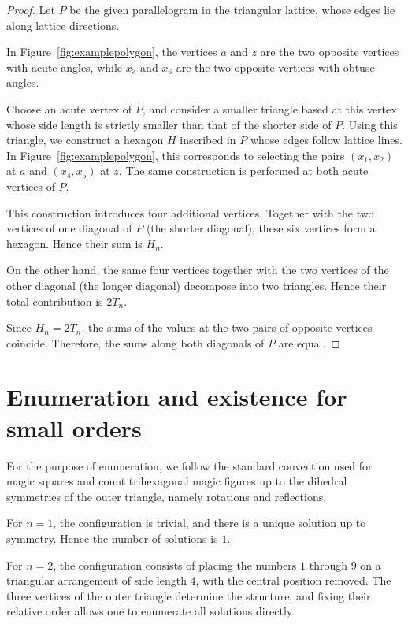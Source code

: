 \documentclass[11pt]{article}
\theoremstyle{plain}
\theoremstyle{definition}
\begin{document}
\begin{proof}
Let $P$ be the given parallelogram in the triangular lattice,
whose edges lie along lattice directions.

In Figure~\ref{fig:examplepolygon}, the vertices $a$ and $z$ are the two opposite vertices with acute angles, 
while $x_3$ and $x_6$ are the two opposite vertices with obtuse angles.

Choose an acute vertex of $P$, and consider a smaller triangle based at this vertex 
whose side length is strictly smaller than that of the shorter side of $P$. 
Using this triangle, we construct a hexagon $H$ inscribed in $P$ whose edges follow lattice lines. 
In Figure~\ref{fig:examplepolygon}, this corresponds to selecting the pairs $(x_1,x_2)$ at $a$ and $(x_4,x_5)$ at $z$. 
The same construction is performed at both acute vertices of $P$.

This construction introduces four additional vertices.
Together with the two vertices of one diagonal of $P$ (the shorter diagonal),
these six vertices form a hexagon.
Hence their sum is $H_n$.

On the other hand, the same four vertices together with the two vertices of the other diagonal
(the longer diagonal) decompose into two triangles.
Hence their total contribution is $2T_n$.

Since $H_n = 2T_n$, the sums of the values at the two pairs of opposite vertices coincide.
Therefore, the sums along both diagonals of $P$ are equal.
\end{proof}


\section{Enumeration and existence for small orders}

For the purpose of enumeration, we follow the standard convention used for magic squares and count trihexagonal magic figures up to the dihedral symmetries of the outer triangle, namely rotations and reflections.


For $n=1$, the configuration is trivial, and there is a unique solution up to symmetry. Hence the number of solutions is $1$.

For $n=2$, the configuration consists of placing the numbers $1$ through $9$ on a triangular arrangement of side length $4$, with the central position removed. The three vertices of the outer triangle determine the structure, and fixing their relative order allows one to enumerate all solutions directly.
\end{document}
